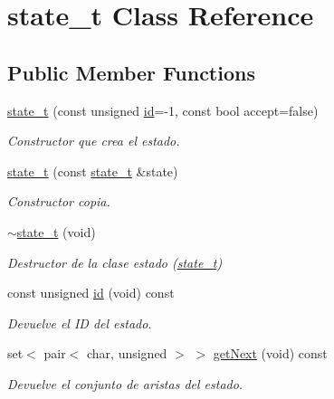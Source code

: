 \hypertarget{classstate__t}{}\section{state\+\_\+t Class Reference}
\label{classstate__t}
\subsection*{Public Member Functions}
\begin{DoxyCompactItemize}
\item 
\hyperlink{classstate__t_a424022379fa10074d6871d6123c8f320}{state\+\_\+t} (const unsigned \hyperlink{classstate__t_ade808c541a78e337c021020842e3c21d}{id}=-\/1, const bool accept=false)
\begin{DoxyCompactList}\small\item\em Constructor que crea el estado. \end{DoxyCompactList}\item 
\hyperlink{classstate__t_a0927d11d7e1113c51d090e7261c41ed3}{state\+\_\+t} (const \hyperlink{classstate__t}{state\+\_\+t} \&state)
\begin{DoxyCompactList}\small\item\em Constructor copia. \end{DoxyCompactList}\item 
\mbox{\label{classstate__t_af27723c21f5cbdbdc237e4bd7aaff2ed}} 
\hyperlink{classstate__t_af27723c21f5cbdbdc237e4bd7aaff2ed}{$\sim$state\+\_\+t} (void)
\begin{DoxyCompactList}\small\item\em Destructor de la clase estado (\hyperlink{classstate__t}{state\+\_\+t}) \end{DoxyCompactList}\item 
const unsigned \hyperlink{classstate__t_ade808c541a78e337c021020842e3c21d}{id} (void) const
\begin{DoxyCompactList}\small\item\em Devuelve el ID del estado. \end{DoxyCompactList}\item 
set$<$ pair$<$ char, unsigned $>$ $>$ \hyperlink{classstate__t_a2ab5aaf45f890ade849fc87a0da80f6a}{get\+Next} (void) const
\begin{DoxyCompactList}\small\item\em Devuelve el conjunto de aristas del estado. \end{DoxyCompactList}\item 

\end{DoxyCompactItemize}
